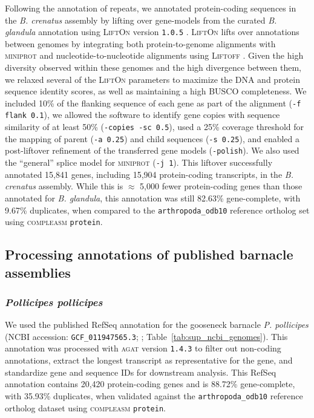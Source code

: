 \documentclass[11pt]{article}
\begin{document}
Following the annotation of repeats, we annotated protein-coding sequences in the
\textit{B. crenatus} assembly by lifting over gene-models from the curated \textit{B.
glandula} annotation using \textsc{LiftOn} version \texttt{1.0.5}
\citep{chao_lifton_2024}.
\textsc{LiftOn} lifts over annotations between genomes by integrating both
protein-to-genome alignments with \textsc{miniprot} \citep{li_miniprot_2023} and
nucleotide-to-nucleotide alignments using \textsc{Liftoff} \citep{shumate_liftoff_2021}.
Given the high diversity observed within these genomes and the high divergence
between them, we relaxed several of the \textsc{LiftOn} parameters to maximize the
DNA and protein sequence identity scores, as well as maintaining a high \textsc{BUSCO}
completeness.
We included 10\% of the flanking sequence of each gene as part of the alignment
(\texttt{-f flank 0.1}), we allowed the software to identify gene copies with sequence
similarity of at least 50\% (\texttt{-copies -sc 0.5}), used a 25\% coverage
threshold for the mapping of parent (\texttt{-a 0.25}) and child sequences
(\texttt{-s 0.25}), and enabled a post-liftover refinement of the transferred
gene models (\texttt{-polish}).
We also used the ``general'' splice model for \textsc{miniprot} (\texttt{-j 1}).
This liftover successfully annotated 15,841 genes, including 15,904 protein-coding
transcripts, in the \textit{B. crenatus} assembly.
While this is $\approx$ 5,000 fewer protein-coding genes than those annotated for
\textit{B. glandula}, this annotation was still 82.63\% gene-complete, with 9.67\%
duplicates, when compared to the \texttt{arthropoda\_odb10} reference ortholog set
using \textsc{compleasm} \texttt{protein}.

\subsection*{Processing annotations of published barnacle assemblies}\label{sec:sup_methods_barnacle_rna}

\subsubsection*{\textit{Pollicipes pollicipes}}

We used the published RefSeq annotation for the gooseneck barnacle \textit{P.
pollicipes} (NCBI accession: \texttt{GCF\_011947565.3};
\cite{bernot_chromosome-level_2022}; Table~\ref{tab:sup_ncbi_genomes}).
This annotation was processed with \textsc{agat} version \texttt{1.4.3}
\citep{dainat_another_2022} to filter out non-coding annotations, extract the longest 
transcript as representative for the gene, and standardize gene and sequence IDs for
downstream analysis.
This RefSeq annotation contains 20,420 protein-coding genes and is 88.72\%
gene-complete, with 35.93\% duplicates, when validated against the
\texttt{arthropoda\_odb10} reference ortholog dataset using \textsc{compleasm}
\texttt{protein}.
\end{document}
